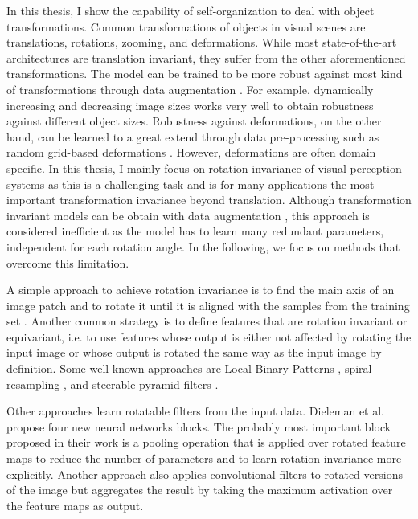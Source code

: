 In this thesis, I show the capability of self-organization to deal with object transformations.
Common transformations of objects in visual scenes are translations, rotations, zooming, and deformations.
While most state-of-the-art architectures are translation invariant, they suffer from the other aforementioned transformations.
The model can be trained to be more robust against most kind of transformations through data augmentation .
For example, dynamically increasing and decreasing image sizes works very well to obtain robustness against different object sizes.
Robustness against deformations, on the other hand, can be learned to a great extend through data pre-processing such as random grid-based deformations .
However, deformations are often domain specific.
In this thesis, I mainly focus on rotation invariance of visual perception systems as this is a challenging task and is for many applications the most important transformation invariance beyond translation.
Although transformation invariant models can be obtain with data augmentation \cite{Simard_Steinkraus_Platt_2003, Fasel_Gatica_Perez_2006}, this approach is considered inefficient as the model has to learn many redundant parameters, independent for each rotation angle.
In the following, we focus on methods that overcome this limitation.

A simple approach to achieve rotation invariance is to find the main axis of an image patch and to rotate it until it is aligned with the samples from the training set .
Another common strategy is to define features that are rotation invariant or equivariant, i.e. to use features whose output is either not affected by rotating the input image or whose output is rotated the same way as the input image by definition.
Some well-known approaches are Local Binary Patterns , spiral resampling , and steerable pyramid filters .

Other approaches learn rotatable filters from the input data.
Dieleman et al.  propose four new neural networks blocks.
The probably most important block proposed in their work is a pooling operation that is applied over rotated feature maps to  reduce the number of parameters and to learn rotation invariance more explicitly.
Another approach  also applies convolutional filters to rotated versions of the image but aggregates the result by taking the maximum activation over the feature maps as output.

